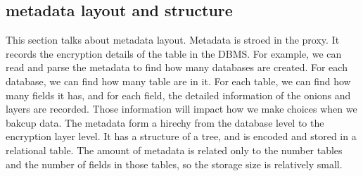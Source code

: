 \subsection{metadata layout and structure}

This section talks about metadata layout. Metadata is stroed in the proxy. It records the encryption details of the table in the DBMS. For example, we can read and parse the metadata to find how many databases are created. For each database, we can find how many table are in it. For each table, we can find how many fields it has, and for each field, the detailed information of the onions and layers are recorded. Those information will impact how we make choices when we bakcup data. The metadata form a hirechy from the database level to the encryption layer level. It has a structure of a tree, and is encoded and stored in a relational table. The amount of metadata is related only to the number tables and the number of fields in those tables, so the storage size is relatively small.











